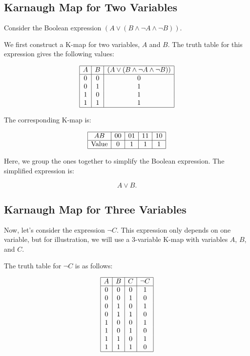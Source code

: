 \subsection{Karnaugh Map for Two Variables}

Consider the Boolean expression \( (A \lor (B \land \neg A \land \neg B)) \).

We first construct a K-map for two variables, \(A\) and \(B\). The truth table for this expression
gives the following values:

\[
	\begin{array}{|c|c|c|}
		\hline
		A & B & (A \lor (B \land \neg A \land \neg B)) \\
		\hline
		0 & 0 & 0                                      \\
		0 & 1 & 1                                      \\
		1 & 0 & 1                                      \\
		1 & 1 & 1                                      \\
		\hline
	\end{array}
\]

The corresponding K-map is:

\[
	\begin{array}{|c|c|c|c|c|}
		\hline
		AB           & 00 & 01 & 11 & 10 \\
		\hline
		\text{Value} & 0  & 1  & 1  & 1  \\
		\hline
	\end{array}
\]

Here, we group the ones together to simplify the Boolean expression. The simplified expression is:

\[
	A \lor B.
\]

\subsection{Karnaugh Map for Three Variables}

Now, let's consider the expression \( \neg C \). This expression only
depends on one variable, but for illustration, we will use a
3-variable K-map with variables \(A\), \(B\), and \(C\).

The truth table for \( \neg C \) is as follows:

\[
	\begin{array}{|c|c|c|c|}
		\hline
		A & B & C & \neg C \\
		\hline
		0 & 0 & 0 & 1      \\
		0 & 0 & 1 & 0      \\
		0 & 1 & 0 & 1      \\
		0 & 1 & 1 & 0      \\
		1 & 0 & 0 & 1      \\
		1 & 0 & 1 & 0      \\
		1 & 1 & 0 & 1      \\
		1 & 1 & 1 & 0      \\
		\hline
	\end{array}
\]

